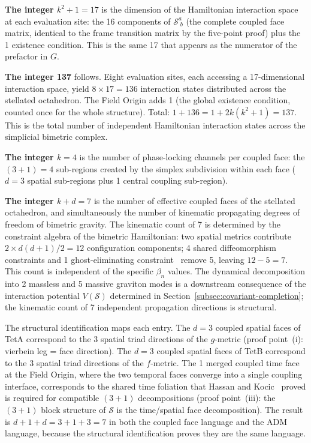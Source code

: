 \documentclass[aps,prd,preprint,superscriptaddress,showpacs,preprintnumbers,amsmath,amssymb,nofootinbib]{revtex4-2}
\begin{document}
\textbf{The integer $k^2 + 1 = 17$} is the dimension of the Hamiltonian interaction space at each evaluation site: the 16 components of $\mathcal{S}^a_{\;b}$ (the complete coupled face matrix, identical to the frame transition matrix by the five-point proof) plus the 1 existence condition. This is the same 17 that appears as the numerator of the prefactor in $G$.

\textbf{The integer 137} follows. Eight evaluation sites, each accessing a 17-dimensional interaction space, yield $8 \times 17 = 136$ interaction states distributed across the stellated octahedron. The Field Origin adds 1 (the global existence condition, counted once for the whole structure). Total: $1 + 136 = 1 + 2k(k^2 + 1) = 137$. This is the total number of independent Hamiltonian interaction states across the simplicial bimetric complex.

\textbf{The integer $k = 4$} is the number of phase-locking channels per coupled face: the $(3{+}1) = 4$ sub-regions created by the simplex subdivision within each face ($d = 3$ spatial sub-regions plus 1 central coupling sub-region).

\textbf{The integer $k + d = 7$} is the number of effective coupled faces of the stellated octahedron, and simultaneously the number of kinematic propagating degrees of freedom of bimetric gravity. The kinematic count of 7 is determined by the constraint algebra of the bimetric Hamiltonian: two spatial metrics contribute $2 \times d(d{+}1)/2 = 12$ configuration components; 4 shared diffeomorphism constraints and 1 ghost-eliminating constraint~\cite{hassan2012} remove 5, leaving $12 - 5 = 7$. This count is independent of the specific $\beta_n$ values. The dynamical decomposition into 2 massless and 5 massive graviton modes is a downstream consequence of the interaction potential $V(\mathcal{S})$ determined in Section~\ref{subsec:covariant-completion}; the kinematic count of 7 independent propagation directions is structural.

The structural identification maps each entry. The $d = 3$ coupled spatial faces of TetA correspond to the 3 spatial triad directions of the $g$-metric (proof point~(i): vierbein leg = face direction). The $d = 3$ coupled spatial faces of TetB correspond to the 3 spatial triad directions of the $f$-metric. The 1 merged coupled time face at the Field Origin, where the two temporal faces converge into a single coupling interface, corresponds to the shared time foliation that Hassan and Kocic~\cite{hassankocic2018} proved is required for compatible $(3{+}1)$ decompositions (proof point~(iii): the $(3{+}1)$ block structure of $\mathcal{S}$ is the time/spatial face decomposition). The result is $d + 1 + d = 3 + 1 + 3 = 7$ in both the coupled face language and the ADM language, because the structural identification proves they are the same language.
\end{document}
